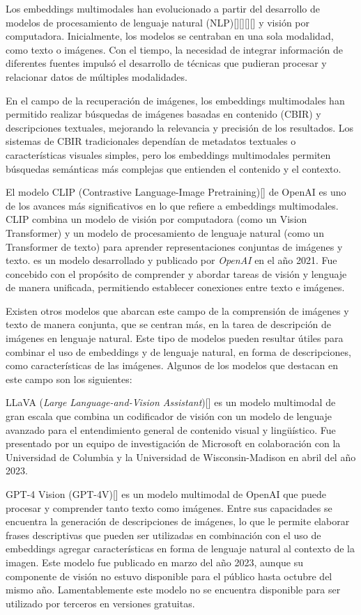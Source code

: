 Los embeddings multimodales han evolucionado a partir del desarrollo de modelos de procesamiento de lenguaje natural (NLP)[\cite{LLaMA2023}][\cite{gpt3}][\cite{bert}][\cite{gpt4}] y visión por computadora. Inicialmente, los modelos se centraban en una sola modalidad, como texto o imágenes. Con el tiempo, la necesidad de integrar información de diferentes fuentes impulsó el desarrollo de técnicas que pudieran procesar y relacionar datos de múltiples modalidades.

En el campo de la recuperación de imágenes, los embeddings multimodales han permitido realizar búsquedas de imágenes basadas en contenido (CBIR) y descripciones textuales, mejorando la relevancia y precisión de los resultados. Los sistemas de CBIR tradicionales dependían de metadatos textuales o características visuales simples, pero los embeddings multimodales permiten búsquedas semánticas más complejas que entienden el contenido y el contexto.

El modelo CLIP (Contrastive Language-Image Pretraining)[\cite{clip-paper}] de OpenAI es uno de los avances más significativos en lo que refiere a  embeddings multimodales. CLIP combina un modelo de visión por computadora (como un Vision Transformer) y un modelo de procesamiento de lenguaje natural (como un Transformer de texto) para aprender representaciones conjuntas de imágenes y texto. 
es un modelo desarrollado y publicado por \textit{OpenAI} en el a\~no 2021. Fue concebido con el prop\'osito de comprender y abordar tareas de visi\'on y lenguaje de manera unificada, permitiendo establecer conexiones entre texto e im\'agenes.

Existen otros modelos que abarcan este campo de la comprensión de imágenes y texto de manera conjunta, que se centran más, en la tarea de descripción de imágenes en lenguaje natural. Este tipo de modelos pueden resultar útiles para combinar el uso de embeddings y de lenguaje natural, en forma de descripciones, como características de las imágenes. Algunos de los modelos que destacan en este campo son los siguientes:

LLaVA (\textit{Large Language-and-Vision Assistant})[\cite{llava}] es un modelo multimodal de gran escala que combina un codificador de visi\'on con un modelo de lenguaje avanzado para el entendimiento general de contenido visual y lingü\'istico. Fue presentado por un equipo de investigaci\'on de Microsoft en colaboraci\'on con la Universidad de Columbia y la Universidad de Wisconsin-Madison en abril del a\~no 2023.

GPT-4 Vision (GPT-4V)[\cite{gpt-4v}] es un modelo multimodal de OpenAI que puede procesar y comprender tanto texto como imágenes. Entre sus capacidades se encuentra la generación de descripciones de imágenes, lo que le permite elaborar frases descriptivas que pueden ser utilizadas en combinaci\'on con el uso de embeddings agregar características en forma de lenguaje natural al contexto de la imagen. Este modelo fue publicado en marzo del a\~no 2023, aunque su componente de visi\'on no estuvo disponible para el p\'ublico hasta octubre del mismo a\~no. Lamentablemente este modelo no se encuentra disponible para ser utilizado por terceros en versiones gratuitas.



